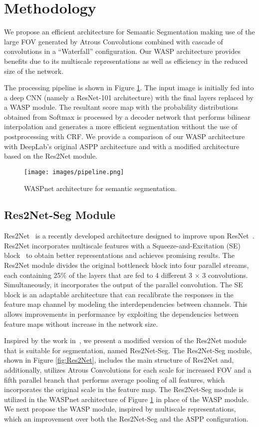 \documentclass[sensors,article,accept,moreauthors,pdftex]{Definitions/mdpi}
\begin{document}
\section{Methodology}

We propose an efficient architecture for Semantic Segmentation making use of the large FOV generated by Atrous Convolutions combined with cascade of convolutions in a ``Waterfall'' configuration. Our WASP architecture provides benefits due to its multiscale representations as well as efficiency in the reduced size of the network.

The processing pipeline is shown in Figure \ref{fig:pipeline}. The input image is initially fed into a deep CNN (namely a ResNet-101 architecture) with the final layers replaced by a WASP module. The resultant score map with the probability distributions obtained from Softmax is processed by a decoder network that performs bilinear interpolation and generates a more efficient segmentation without the use of postprocessing with CRF. We provide a comparison of our WASP architecture with DeepLab's original ASPP architecture and with a modified architecture based on the Res2Net module.

\begin{figure}[H]
\centering
\texttt{[image: images/pipeline.png]}
\caption{WASPnet architecture for semantic segmentation.}
\label{fig:pipeline}
\end{figure}

\subsection{Res2Net-Seg Module}
Res2Net~\cite{Res2Net} is a recently developed architecture designed to improve upon  ResNet~\cite{ResNet}.
Res2Net incorporates multiscale features with a Squeeze-and-Excitation (SE) block~\cite{SE} to obtain better representations and achieves promising results. The Res2Net module divides the original bottleneck block into four parallel streams, each containing 25\% of the layers that are fed to 4 different 3 $\times$ 3 convolutions. Simultaneously, it incorporates the output of the parallel convolution.
The SE block is an adaptable architecture that can recalibrate the responses in the feature map channel by modeling the interdependencies between channels. This allows improvements in performance by exploiting the dependencies between feature maps without increase in the network size.


Inspired by the work in~\cite{Res2Net}, we present a modified version of the Res2Net module that is suitable for segmentation, named Res2Net-Seg. The Res2Net-Seg module, shown in Figure \ref{fig:Res2Net}, includes the main structure of Res2Net and, additionally, utilizes Atrous Convolutions for each scale for increased FOV and a fifth parallel branch that performs average pooling of all features, which incorporates the original scale in the feature map.
The Res2Net-Seg module is utilized in the WASPnet architecture of Figure \ref{fig:pipeline} in place of the WASP module.
We next propose the WASP module, inspired by multiscale representations, which an improvement over both the Res2Net-Seg and the ASPP configuration.
\end{document}
